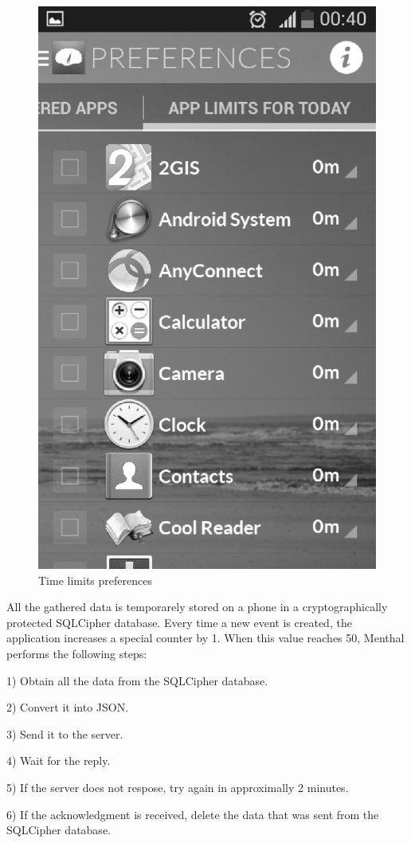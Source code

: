 \begin{figure}[h]
\begin{minipage}{.5\textwidth}
  \includegraphics [width=.8\textwidth]{images/Menthal_GUI_preferences}
  \caption{Time limits preferences}
  \label{fig:menthal_gui_preferences}
\end{minipage}
\end{figure}

All the gathered data is temporarely stored on a phone in a cryptographically protected SQLCipher database.
Every time a new event is created, the application increases a special counter by 1.
When this value reaches 50, Menthal performs the following steps:

1) Obtain all the data from the SQLCipher database.

2) Convert it into JSON.

3) Send it to the server.

4) Wait for the reply.

5) If the server does not respose, try again in approximally 2 minutes. 

6) If the acknowledgment is received, delete the data that was sent from the SQLCipher database.

